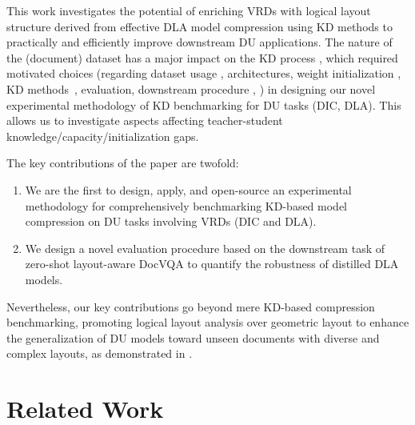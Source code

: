 \documentclass[runningheads]{llncs}
\begin{document}
This work investigates the potential of enriching VRDs with logical layout structure derived from effective DLA model compression using KD methods to practically and efficiently improve downstream DU applications.
The nature of the (document) dataset has a major impact on the KD process \cite{stanton2021does}, which required motivated choices (regarding dataset usage \cite{pfitzmann2022doclaynet,
    antonacopoulos2009realistic,
    harley2015evaluation}, architectures, weight initialization \cite{li2022dit}, KD methods~\cite{SimKD, he2021distilling, chen2021distilling, zhang2020distilling, hsieh2023distilling,hinton2015distilling}, evaluation, downstream procedure \cite{wang2023layout}, \etc) in designing our novel experimental methodology of KD benchmarking for DU tasks (DIC, DLA). This allows us to investigate aspects affecting teacher-student knowledge/capacity/initialization gaps.

\noindent The key contributions of the paper are twofold:
\begin{enumerate}
    [label=\Roman*.,leftmargin=2\parindent]
    \item  We are the first to design, apply, and open-source an experimental methodology for comprehensively benchmarking KD-based model compression on DU tasks involving VRDs (DIC and DLA).
    \item  We design a novel evaluation procedure based on the downstream task of zero-shot layout-aware DocVQA to quantify the robustness of distilled DLA models.
\end{enumerate}

\noindent Nevertheless, our key contributions go beyond mere KD-based compression benchmarking, promoting logical layout analysis over geometric layout to enhance the generalization of DU models toward unseen documents with diverse and complex layouts, as demonstrated in .

\section{Related Work}
\end{document}
